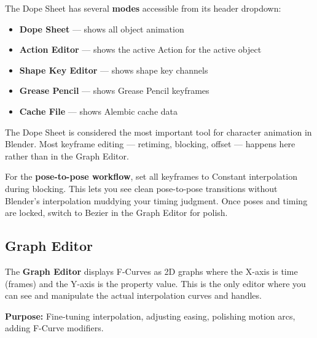 The Dope Sheet has several \textbf{modes} accessible from its header dropdown:

\begin{itemize}[leftmargin=2em]
  \item \textbf{Dope Sheet} --- shows all object animation
  \item \textbf{Action Editor} --- shows the active Action for the active object
  \item \textbf{Shape Key Editor} --- shows shape key channels
  \item \textbf{Grease Pencil} --- shows Grease Pencil keyframes
  \item \textbf{Cache File} --- shows Alembic cache data
\end{itemize}

The Dope Sheet is considered the most important tool for character animation in Blender. Most keyframe editing --- retiming, blocking, offset --- happens here rather than in the Graph Editor.

\begin{tipbox}
For the \textbf{pose-to-pose workflow}, set all keyframes to Constant interpolation during blocking. This lets you see clean pose-to-pose transitions without Blender's interpolation muddying your timing judgment. Once poses and timing are locked, switch to Bezier in the Graph Editor for polish.
\end{tipbox}

\subsection{Graph Editor}
\label{subsec:graph-editor}

The \textbf{Graph Editor} displays F-Curves as 2D graphs where the X-axis is time (frames) and the Y-axis is the property value. This is the only editor where you can see and manipulate the actual interpolation curves and handles.

\textbf{Purpose:} Fine-tuning interpolation, adjusting easing, polishing motion arcs, adding F-Curve modifiers.

